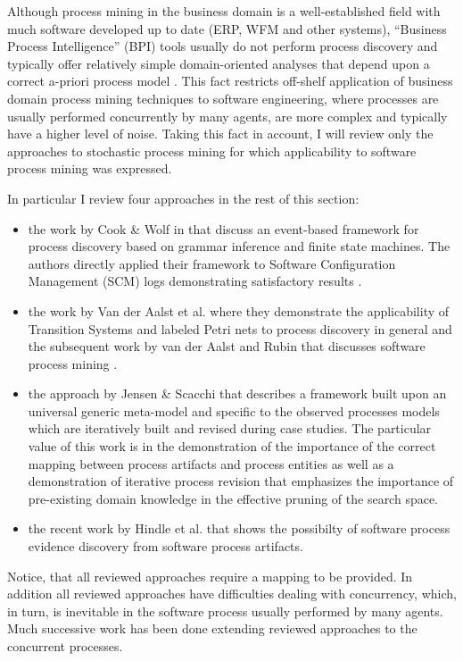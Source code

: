 Although process mining in the business domain is a well-established field with much software developed up to date 
(ERP, WFM and other systems), ``Business Process Intelligence'' (BPI) tools usually do not perform process discovery and 
typically offer relatively simple domain-oriented analyses that depend upon a correct a-priori process model 
\cite{citeulike:3718014} \cite{citeulike:5044991}. 
This fact restricts off-shelf application of business domain process mining techniques to software engineering, where 
processes are usually performed concurrently by many agents, are more complex and typically have a higher level of noise. 
Taking this fact in account, I will review only the approaches to stochastic process mining for which applicability to software 
process mining was expressed. 

In particular I review four approaches in the rest of this section: 
\begin{itemize}
 \item the work by Cook \& Wolf in that discuss an event-based framework for process discovery based on grammar 
  inference and finite state machines. 
  The authors directly applied their framework to Software Configuration Management (SCM) logs demonstrating satisfactory 
  results \cite{citeulike:328044}.
 \item the work by Van der Aalst et al. where they demonstrate the applicability of Transition Systems and labeled Petri nets 
  to process discovery in general \cite{citeulike:3718014} and the subsequent work by van der Aalst and Rubin 
  that discusses software process mining \cite{citeulike:1885717}.
 \item the approach by Jensen \& Scacchi \cite{citeulike:5043664} that describes a framework built upon an universal generic 
  meta-model and specific to the observed processes models which are iteratively built and revised during case studies. 
  The particular value of this work is in the demonstration of the importance of the correct mapping between process artifacts 
  and process entities as well as a demonstration of iterative process revision that emphasizes the importance of pre-existing 
  domain knowledge in the effective pruning of the search space.
\item the recent work by Hindle et al. \cite{citeulike:9114115} \cite{citeulike:9007622} that shows the possibilty of software 
  process evidence discovery from software process artifacts.
\end{itemize}

Notice, that all reviewed approaches require a mapping to be provided. In addition all reviewed approaches have difficulties 
dealing with concurrency, which, in turn, is inevitable in the software process usually performed by many agents. 
Much successive work has been done extending reviewed approaches to the concurrent processes. 

